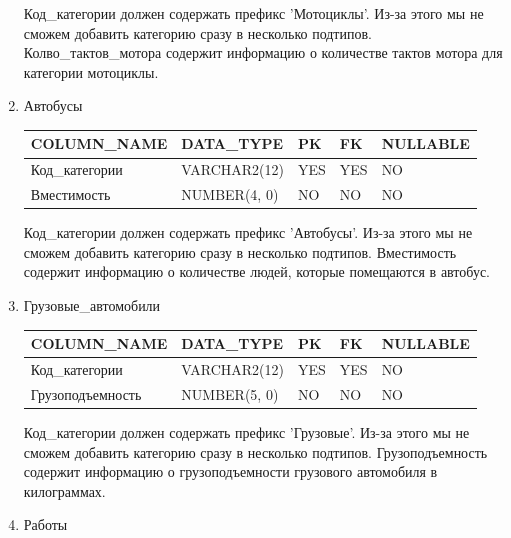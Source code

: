 \begin{enumerate}
\begin{tabular}{|p{7cm}|p{3cm}|p{1cm}|p{1cm}|p{3cm}|}
    \end{tabular}

    Код\_категории должен содержать префикс 'Мотоциклы'. Из-за этого мы не сможем добавить категорию сразу в несколько подтипов.
    Колво\_тактов\_мотора содержит информацию о количестве тактов мотора для категории мотоциклы.

    \item{Автобусы}

    \begin{tabular}{|p{7cm}|p{3cm}|p{1cm}|p{1cm}|p{3cm}|} \hline

        {\bf COLUMN\_NAME} & {\bf DATA\_TYPE} & {\bf PK} & {\bf FK} & {\bf NULLABLE} \\ \hline
        Код\_категории & VARCHAR2(12) & YES & YES & NO \\ \hline
        Вместимость & NUMBER(4, 0) & NO & NO & NO \\ \hline

    \end{tabular}

    Код\_категории должен содержать префикс 'Автобусы'. Из-за этого мы не сможем добавить категорию сразу в несколько подтипов.
    Вместимость содержит информацию о количестве людей, которые помещаются в автобус.

    \item{Грузовые\_автомобили}

    \begin{tabular}{|p{7cm}|p{3cm}|p{1cm}|p{1cm}|p{3cm}|} \hline

        {\bf COLUMN\_NAME} & {\bf DATA\_TYPE} & {\bf PK} & {\bf FK} & {\bf NULLABLE} \\ \hline
        Код\_категории & VARCHAR2(12) & YES & YES & NO \\ \hline
        Грузоподъемность & NUMBER(5, 0) & NO & NO & NO \\ \hline

    \end{tabular}

    Код\_категории должен содержать префикс 'Грузовые'. Из-за этого мы не сможем добавить категорию сразу в несколько подтипов.
    Грузоподъемность содержит информацию о грузоподъемности грузового автомобиля в килограммах.

    \item{Работы}

    \begin{tabular}{|p{7cm}|p{3cm}|p{1cm}|p{1cm}|p{3cm}|} \hline


\end{tabular}
\end{enumerate}
